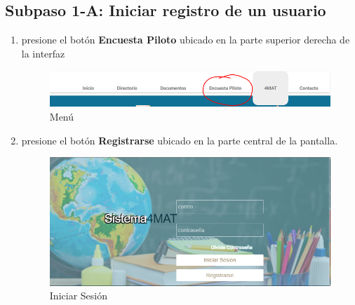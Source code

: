 \subsection{Subpaso 1-A: Iniciar registro de un usuario}
\begin{enumerate}
	\item presione el botón \textbf{Encuesta Piloto} ubicado en la parte 
		superior derecha de la interfaz
		\begin{figure}[hbtp]
		
		\includegraphics[scale=0.7]{images/Interfaz/IUGS11_botonEncuesta.png}
		\caption{Menú}
	\end{figure}
	\item presione el botón \textbf{Registrarse} ubicado en la parte central 
	de la pantalla. 
	\begin{figure}[hbtp]
		
		\includegraphics[scale=0.7]{images/Interfaz/IUGS00_login.png}
		\caption{Iniciar Sesión}
	\end{figure}
\end{enumerate}


	

	